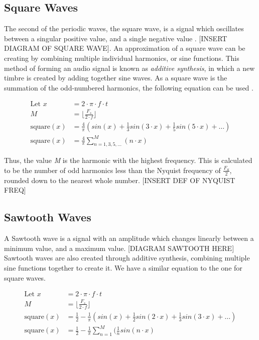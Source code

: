 \subsection{Square Waves}
The second of the periodic waves, the square wave, is a signal which oscillates between a singular positive value, and a single negative value \cite{Tarr_2019}. [INSERT DIAGRAM OF SQUARE WAVE]. An approximation of a square wave can be creating by combining multiple individual harmonics, or sine functions. This method of forming an audio signal is known as \textit{additive synthesis}, in which a new timbre is created by adding together sine waves. As a square wave is the summation of the odd-numbered harmonics, the following equation can be used \cite{Tarr_2019}.

\begin{align}
    \textrm{Let } x &= 2 \cdot \pi \cdot f \cdot t \\
    M &= \bigg \lfloor \frac{F_s}{2 \cdot f} \bigg \rfloor \\
    \textrm{square}(x) &= \frac{4}{\pi}(sin(x) + \frac{1}{3}sin(3 \cdot x) + \frac{1}{5}sin(5 \cdot x) + \dots) \\
    \textrm{square}(x) &= \frac{4}{\pi}\sum_{n=1, 3, 5, \dots}^{M}(n \cdot x)
\end{align}

Thus, the value \textit{M} is the harmonic with the highest frequency. This is calculated to be the number of odd harmonics less than the Nyquist frequency of $\frac{F_S}{2}$, rounded down to the nearest whole number. [INSERT DEF OF NYQUIST FREQ]

\subsection{Sawtooth Waves}
A Sawtooth wave is a signal with an amplitude which changes linearly between a minimum value, and a maximum value. [DIAGRAM SAWTOOTH HERE] Sawtooth waves are also created through additive synthesis, combining multiple sine functions together to create it. We have a similar equation to the one for square waves. 

\begin{align}
    \textrm{Let } x &= 2 \cdot \pi \cdot f \cdot t \\
    M &= \bigg \lfloor \frac{F_s}{2 \cdot f} \bigg \rfloor \\
    \textrm{square}(x) &= \frac{1}{2} - \frac{1}{\pi}(sin(x) + \frac{1}{2}sin(2 \cdot x) + \frac{1}{3}sin(3 \cdot x) + \dots) \\
    \textrm{square}(x) &= \frac{1}{2} - \frac{1}{\pi}\sum_{n=1}^{M}(\frac{1}{n}sin(n \cdot x)
\end{align}

